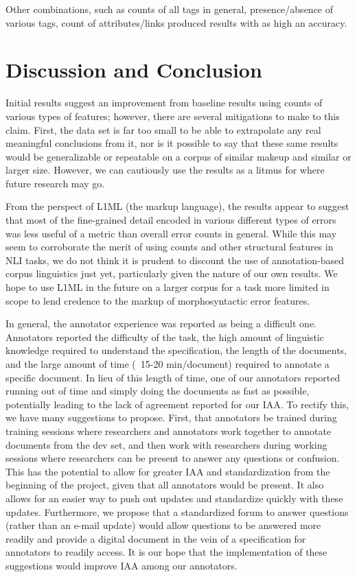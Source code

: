 \documentclass[10pt, a4paper]{article}
\begin{document}
Other combinations, such as counts of all tags in general, presence/absence of various tags, count of attributes/links produced results with as high an accuracy.

\section{Discussion and Conclusion\label{sec:discussion}}
Initial results suggest an improvement from baseline results using counts of various types of features; however, there are several mitigations to make to this claim. First, the data set is far too small to be able to extrapolate any real meaningful conclusions from it, nor is it possible to say that these same results would be generalizable or repeatable on a corpus of similar makeup and similar or larger size. However, we can cautiously use the results as a litmus for where future research may go. 

From the perspect of L1ML (the markup language), the results appear to suggest that most of the fine-grained detail encoded in various different types of errors was less useful of a metric than overall error counts in general. While this may seem to corroborate the merit of using counts and other structural features in NLI tasks, we do not think it is prudent to discount the use of annotation-based corpus linguistics just yet, particularly given the nature of our own results. We hope to use L1ML in the future on a larger corpus for a task more limited in scope to lend credence to the markup of morphosyntactic error features.

In general, the annotator experience was reported as being a difficult one. Annotators reported the difficulty of the task, the high amount of linguistic knowledge required to understand the specification, the length of the documents, and the large amount of time (~15-20 min/document) required to annotate a specific document. In lieu of this length of time, one of our annotators reported running out of time and simply doing the documents as fast as possible, potentially leading to the lack of agreement reported for our IAA. To rectify this, we have many suggestions to propose. First, that annotators be trained during training sessions where researchers and annotators work together to annotate documents from the dev set, and then work with researchers during working sessions where researchers can be present to answer any questions or confusion. This has the potential to allow for greater IAA and standardization from the beginning of the project, given that all annotators would be present. It also allows for an easier way to push out updates and standardize quickly with these updates. Furthermore, we propose that a standardized forum to answer questions (rather than an e-mail update) would allow questions to be answered more readily and provide a digital document in the vein of a specification for annotators to readily access. It is our hope that the implementation of these suggestions would improve IAA among our annotators.
\end{document}
